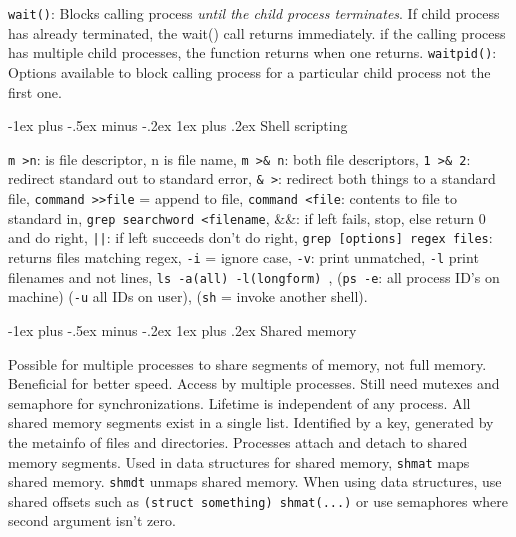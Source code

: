 \documentclass[10pt,landscape, a4paper]{article}
\makeatletter
\renewcommand{\subsection}{\@startsection{section}{1}{0mm}%
                                {-1ex plus -.5ex minus -.2ex}%
                                {0.5ex plus .2ex}%
                                {\normalfont\large\bfseries}}
\renewcommand{\subsection}{\@startsection{subsection}{2}{0mm}%
                                {-1explus -.5ex minus -.2ex}%
                                {0.5ex plus .2ex}%
                                {\normalfont\normalsize\bfseries}}
\renewcommand{\subsection}{\@startsection{subsubsection}{3}{0mm}%
                                {-1ex plus -.5ex minus -.2ex}%
                                {1ex plus .2ex}%
                                {\normalfont\small\bfseries}}
\makeatother
\begin{document}
\begin{multicols}{3}


\texttt{wait()}: Blocks calling process \emph{until the child process terminates}. 
If child process has already terminated, the wait() call returns immediately. 
if the calling process has multiple child processes, the function returns when one returns.
\texttt{waitpid()}: Options available to block calling process for a particular 
child process not the first one.

\subsection{Shell scripting}

\texttt{m \textgreater n}: is file descriptor, n is file name,
\texttt{m \textgreater \& n}: both file descriptors,
\texttt{1 \textgreater \& 2}: redirect standard out to standard error,
\texttt{\& \textgreater}: redirect both things to a standard file,
\texttt{command \textgreater\textgreater file} = append to file,
\texttt{command \textless file}: contents to file to standard in,
\texttt{grep searchword \textless filename},
\&\&: if left fails, stop, else return 0 and do right,
\texttt{||}: if left succeeds don't do right,
\texttt{grep [options] regex files}: returns files matching regex,
\texttt{-i} = ignore case, \texttt{-v}: print unmatched, \texttt{-l} print filenames and not lines,
\texttt{ls -a(all) -l(longform)	},
(\texttt{ps -e}: all process ID's on machine) (\texttt{-u} all IDs on user),
(\texttt{sh} = invoke another shell).



\subsection{Shared memory}

Possible for multiple processes to share segments of memory, 
not full memory. Beneficial for better speed. Access by multiple processes.
Still need mutexes and semaphore for synchronizations. 
Lifetime is independent of any process. All shared memory segments 
exist in a single list. Identified by a key, generated by the metainfo of 
files and directories. Processes attach and detach to shared memory segments.
Used in data structures for shared memory, \texttt{shmat} maps shared memory.
\texttt{shmdt} unmaps shared memory. When using data structures, use shared offsets such as
\texttt{(struct something) shmat(...)} or use semaphores where second argument isn't
zero.


\end{multicols}
\end{document}
